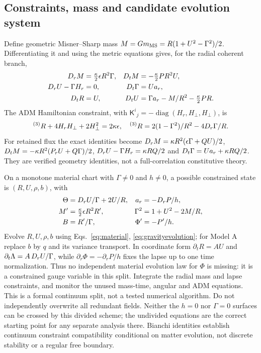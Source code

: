 \subsection{Constraints, mass and candidate evolution system}
Define geometric Misner--Sharp mass $M=Gm_{\rm MS}=R(1+U^2-\Gamma^2)/2$. Differentiating it and using the metric equations gives, for the radial coherent branch,
\begin{align}
 D_r M&=\tfrac{\kappa}2\epsilon R^2\Gamma,&D_t M&=-\tfrac{\kappa}2 P R^2U,\\
 D_r U-\Gamma H_r&=0,&D_t\Gamma&=U a_r,\\
 D_t R&=U,&D_t U&=\Gamma a_r-M/R^2-\tfrac{\kappa}2 PR.\label{eq:gravityevolution}
\end{align}
The ADM Hamiltonian constraint, with $\mathsf K^i{}_j=-\operatorname{diag}(H_r,H_\perp,H_\perp)$, is
\begin{equation}
 {}^{(3)}R+4H_rH_\perp+2H_\perp^2=2\kappa\epsilon,\quad
 {}^{(3)}R=2(1-\Gamma^2)/R^2-4D_r\Gamma/R.
\end{equation}
For retained flux the exact identities become $D_r M=\kappa R^2(\epsilon\Gamma+QU)/2$, $D_t M=-\kappa R^2(P_rU+Q\Gamma)/2$, $D_r U-\Gamma H_r=\kappa RQ/2$ and $D_t\Gamma=Ua_r+\kappa RQ/2$. They are verified geometry identities, not a full-correlation constitutive theory.

On a monotone material chart with $\Gamma\ne0$ and $h\ne0$, a possible constrained state is $(R,U,\rho,b)$, with
\begin{align}
 \Theta&=D_r U/\Gamma+2U/R,& a_r&=-D_r P/h,\\
 M'&=\tfrac{\kappa}2\epsilon R^2R',&\Gamma^2&=1+U^2-2M/R,\\
 B&=R'/\Gamma,&\Phi'&=-P'/h.
\end{align}
Evolve $R,U,\rho,b$ using Eqs.~\eqref{eq:material}, \eqref{eq:gravityevolution}; for Model A replace $b$ by $q$ and its variance transport. In coordinate form $\partial_tR=AU$ and $\partial_t\Lambda=A\,D_r U/\Gamma$, while $\partial_r\Phi=-\partial_rP/h$ fixes the lapse up to one time normalization. Thus no independent material evolution law for $\Phi$ is missing: it is a constrained gauge variable in this split. Integrate the radial mass and lapse constraints, and monitor the unused mass-time, angular and ADM equations. This is a formal continuum split, not a tested numerical algorithm. Do not independently overwrite all redundant fields. Neither the $h=0$ nor $\Gamma=0$ surfaces can be crossed by this divided scheme; the undivided equations are the correct starting point for any separate analysis there. Bianchi identities establish continuum constraint compatibility conditional on matter evolution, not discrete stability or a regular free boundary.

